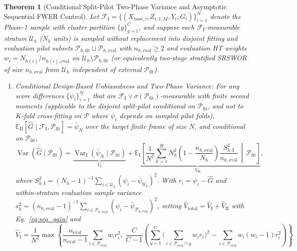 \documentclass[11pt]{article}
\newtheorem{theorem}{Theorem}
\theoremstyle{remark}
\begin{document}
\begin{theorem}[Conditional Split-Pilot Two-Phase Variance and Asymptotic Sequential FWER Control]
\label{thm:two_phase}
Let $\mathcal{F}_{\text{I}} = \{(X_{\text{base},i}, Z_{i,1:M}, Y_i, G_i)\}_{i=1}^N$ denote the Phase-1 sample with cluster partition $\{g\}_{g=1}^C$, and suppose each $\mathcal{F}_{\text{I}}$-measurable stratum $\mathcal{U}_h$ ($N_h$ units) is sampled without replacement into disjoint fitting and evaluation pilot subsets $\mathcal{P}_{h,\text{fit}} \sqcup \mathcal{P}_{h,\text{eval}}$ with $n_{h,\text{eval}} \ge 2$ and evaluation HT weights $w_i = N_{h(i)} / n_{h(i),\text{eval}}$ on $\mathcal{U}_h \setminus \mathcal{P}_{h,\text{fit}}$ (or equivalently two-stage stratified SRSWOR of size $n_{h,\text{eval}}$ from $\mathcal{U}_h$ independent of external $\mathcal{P}_{\text{fit}}$).
\begin{enumerate}
  \item \emph{Conditional Design-Based Unbiasedness and Two-Phase Variance:} For any score differences $\{\psi_i\}_{i=1}^N$ that are $\mathcal{F}_{\text{I}} \vee \sigma(\mathcal{P}_{\text{fit}})$-measurable with finite second moments (applicable to the disjoint split-pilot conditional on $\mathcal{P}_{\text{fit}}$, and \emph{not} to $K$-fold cross-fitting on $\mathcal{P}$ where $\psi_i$ depends on sampled pilot folds), $\mathbb{E}_{\text{II}}[\hat{G} \mid \mathcal{F}_{\text{I}}, \mathcal{P}_{\text{fit}}] = \bar{\psi}_N$ over the target finite frame of size $N$, and conditional on $\mathcal{P}_{\text{fit}}$,
  \begin{equation}
    \operatorname{Var}(\hat{G} \mid \mathcal{P}_{\text{fit}}) = \underbrace{\operatorname{Var}_{\text{I}}(\bar{\psi}_N \mid \mathcal{P}_{\text{fit}})}_{V_{\text{I}}} + \underbrace{\mathbb{E}_{\text{I}}\!\left[\frac{1}{N^2}\sum_{h=1}^H N_h^2 \left(1 - \frac{n_{h,\text{eval}}}{N_h}\right)\frac{S_{h,\text{I}}^2}{n_{h,\text{eval}}} \,\middle|\, \mathcal{P}_{\text{fit}}\right]}_{V_{\text{II}}},
    \label{eq:var_decomp_app}
  \end{equation}
  where $S_{h,\text{I}}^2 = (N_h - 1)^{-1}\sum_{i \in \mathcal{U}_h}(\psi_i - \bar{\psi}_{\mathcal{U}_h})^2$. With $r_i = \psi_i - \hat{G}$ and within-stratum evaluation sample variance $s_h^2 = (n_{h,\text{eval}} - 1)^{-1}\sum_{i \in \mathcal{P}_{h,\text{eval}}}(\psi_i - \bar{\psi}_{\mathcal{P}_{h,\text{eval}}})^2$, setting $\widehat{V}_{\text{total}} = \widehat{V}_{\text{I}} + \widehat{V}_{\text{II}}$ with Eq.~\eqref{eq:seq_gain} and
  \begin{equation}
    \widehat{V}_{\text{I}} = \frac{1}{N^2}\max\!\left\{\frac{n_{\text{eval}}}{n_{\text{eval}}-1}\sum_{i \in \mathcal{P}_{\text{eval}}} w_i r_i^2,\; \frac{C}{C-1}\left(\sum_{g=1}^C \Big(\sum_{i \in \mathcal{P}_{\text{eval}} \cap g} w_i r_i\Big)^2 - \sum_{i \in \mathcal{P}_{\text{eval}}} w_i(w_i - 1)r_i^2\right)\right\}

\end{equation}
\end{enumerate}
\end{theorem}
\end{document}

